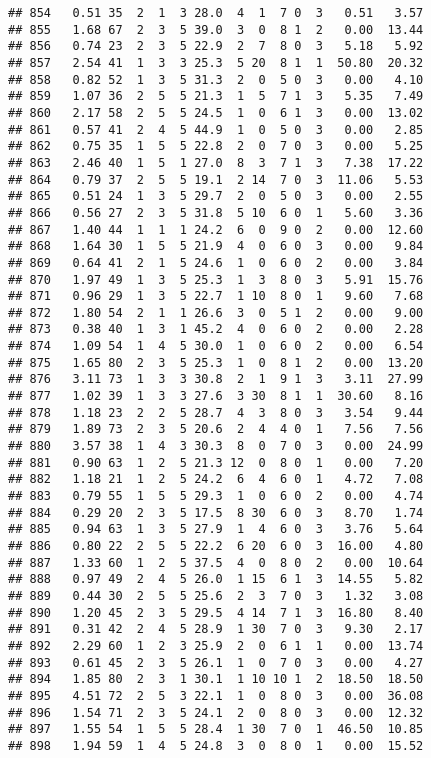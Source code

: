 \documentclass[
]{article}
\begin{document}
\begin{verbatim}
## 854   0.51 35  2  1  3 28.0  4  1  7 0  3   0.51   3.57
## 855   1.68 67  2  3  5 39.0  3  0  8 1  2   0.00  13.44
## 856   0.74 23  2  3  5 22.9  2  7  8 0  3   5.18   5.92
## 857   2.54 41  1  3  3 25.3  5 20  8 1  1  50.80  20.32
## 858   0.82 52  1  3  5 31.3  2  0  5 0  3   0.00   4.10
## 859   1.07 36  2  5  5 21.3  1  5  7 1  3   5.35   7.49
## 860   2.17 58  2  5  5 24.5  1  0  6 1  3   0.00  13.02
## 861   0.57 41  2  4  5 44.9  1  0  5 0  3   0.00   2.85
## 862   0.75 35  1  5  5 22.8  2  0  7 0  3   0.00   5.25
## 863   2.46 40  1  5  1 27.0  8  3  7 1  3   7.38  17.22
## 864   0.79 37  2  5  5 19.1  2 14  7 0  3  11.06   5.53
## 865   0.51 24  1  3  5 29.7  2  0  5 0  3   0.00   2.55
## 866   0.56 27  2  3  5 31.8  5 10  6 0  1   5.60   3.36
## 867   1.40 44  1  1  1 24.2  6  0  9 0  2   0.00  12.60
## 868   1.64 30  1  5  5 21.9  4  0  6 0  3   0.00   9.84
## 869   0.64 41  2  1  5 24.6  1  0  6 0  2   0.00   3.84
## 870   1.97 49  1  3  5 25.3  1  3  8 0  3   5.91  15.76
## 871   0.96 29  1  3  5 22.7  1 10  8 0  1   9.60   7.68
## 872   1.80 54  2  1  1 26.6  3  0  5 1  2   0.00   9.00
## 873   0.38 40  1  3  1 45.2  4  0  6 0  2   0.00   2.28
## 874   1.09 54  1  4  5 30.0  1  0  6 0  2   0.00   6.54
## 875   1.65 80  2  3  5 25.3  1  0  8 1  2   0.00  13.20
## 876   3.11 73  1  3  3 30.8  2  1  9 1  3   3.11  27.99
## 877   1.02 39  1  3  3 27.6  3 30  8 1  1  30.60   8.16
## 878   1.18 23  2  2  5 28.7  4  3  8 0  3   3.54   9.44
## 879   1.89 73  2  3  5 20.6  2  4  4 0  1   7.56   7.56
## 880   3.57 38  1  4  3 30.3  8  0  7 0  3   0.00  24.99
## 881   0.90 63  1  2  5 21.3 12  0  8 0  1   0.00   7.20
## 882   1.18 21  1  2  5 24.2  6  4  6 0  1   4.72   7.08
## 883   0.79 55  1  5  5 29.3  1  0  6 0  2   0.00   4.74
## 884   0.29 20  2  3  5 17.5  8 30  6 0  3   8.70   1.74
## 885   0.94 63  1  3  5 27.9  1  4  6 0  3   3.76   5.64
## 886   0.80 22  2  5  5 22.2  6 20  6 0  3  16.00   4.80
## 887   1.33 60  1  2  5 37.5  4  0  8 0  2   0.00  10.64
## 888   0.97 49  2  4  5 26.0  1 15  6 1  3  14.55   5.82
## 889   0.44 30  2  5  5 25.6  2  3  7 0  3   1.32   3.08
## 890   1.20 45  2  3  5 29.5  4 14  7 1  3  16.80   8.40
## 891   0.31 42  2  4  5 28.9  1 30  7 0  3   9.30   2.17
## 892   2.29 60  1  2  3 25.9  2  0  6 1  1   0.00  13.74
## 893   0.61 45  2  3  5 26.1  1  0  7 0  3   0.00   4.27
## 894   1.85 80  2  3  1 30.1  1 10 10 1  2  18.50  18.50
## 895   4.51 72  2  5  3 22.1  1  0  8 0  3   0.00  36.08
## 896   1.54 71  2  3  5 24.1  2  0  8 0  3   0.00  12.32
## 897   1.55 54  1  5  5 28.4  1 30  7 0  1  46.50  10.85
## 898   1.94 59  1  4  5 24.8  3  0  8 0  1   0.00  15.52

\end{verbatim}
\end{document}
